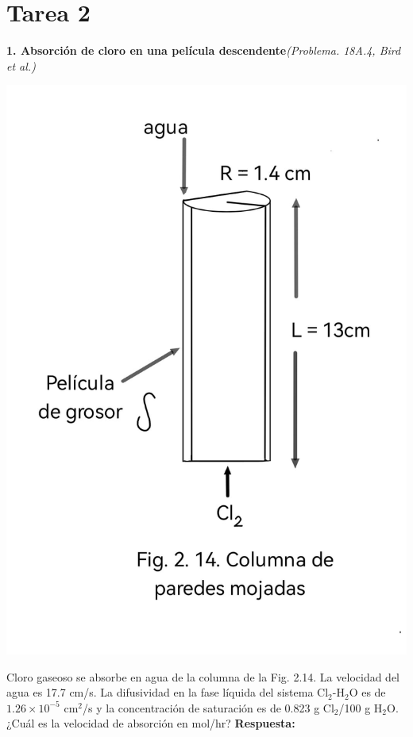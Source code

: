 
\section*{Tarea 2}

\textbf{1. Absorción de cloro en una película descendente}\textit{(Problema. 18A.4, Bird et al.)}
\flushleft
\begin{minipage}{0.3\textwidth} %
    \includegraphics[width=\linewidth]{./Capitulo2/Imagenes/imagen-1.jpg} %
\end{minipage}
\hfill %
\begin{minipage}{0.65\textwidth} %
Cloro gaseoso se absorbe en agua de la columna de la Fig. 2.14. La velocidad del agua es 17.7 cm/s. La difusividad en la fase líquida del sistema Cl$_2$-H$_2$O es de $1.26 \times 10^{-5}$ cm$^2$/s y la concentración de saturación es de 0.823 g Cl$_2$/100 g H$_2$O. ¿Cuál es la velocidad de absorción en mol/hr?
\vspace{0.5cm} %
\flushleft
\textbf{Respuesta:}  
\end{minipage}
\vspace{0.5cm} 

